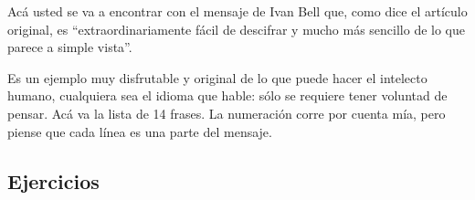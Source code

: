 \begin{parchment}
{Acá  usted se va a encontrar con el mensaje de Ivan Bell que, como dice el artículo original, es “extraordinariamente fácil de descifrar y mucho más sencillo de lo que parece a simple vista”.

Es un ejemplo muy disfrutable y original de lo que puede hacer el intelecto humano, cualquiera sea el idioma que hable: sólo se requiere tener voluntad de pensar. Acá va la lista de 14 frases. La numeración corre por cuenta mía, pero piense que cada línea es una parte del mensaje.
}
\end{parchment}

\subsection{Ejercicios}
 
\bigskip


 
 

